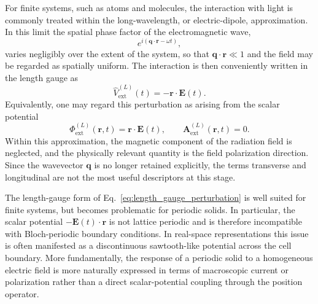 For finite systems, such as atoms and molecules, the interaction with light is commonly treated within the long-wavelength, or electric-dipole, approximation. In this limit the spatial phase factor of the electromagnetic wave,
\begin{equation}
e^{i(\mathbf q\cdot \mathbf r-\omega t)},
\end{equation}
varies negligibly over the extent of the system, so that \(\mathbf q\cdot \mathbf r \ll 1\) and the field may be regarded as spatially uniform. The interaction is then conveniently written in the length gauge as
\begin{equation}
\hat V_{\mathrm{ext}}^{(L)}(t)
=
-\mathbf r \cdot \mathbf E(t).
\label{eq:length_gauge_perturbation}
\end{equation}
Equivalently, one may regard this perturbation as arising from the scalar potential
\begin{equation}
\Phi_{\mathrm{ext}}^{(L)}(\mathbf r,t)
=
\mathbf r\cdot \mathbf E(t),
\qquad
\mathbf A_{\mathrm{ext}}^{(L)}(\mathbf r,t)=0.
\label{eq:length_gauge_potentials}
\end{equation}
Within this approximation, the magnetic component of the radiation field is neglected, and the physically relevant quantity is the field polarization direction. Since the wavevector \(\mathbf q\) is no longer retained explicitly, the terms transverse and longitudinal are not the most useful descriptors at this stage.

The length-gauge form of Eq.~\eqref{eq:length_gauge_perturbation} is well suited for finite systems, but becomes problematic for periodic solids. In particular, the scalar potential \(-\mathbf E(t)\cdot\mathbf r\) is not lattice periodic and is therefore incompatible with Bloch-periodic boundary conditions. In real-space representations this issue is often manifested as a discontinuous sawtooth-like potential across the cell boundary. More fundamentally, the response of a periodic solid to a homogeneous electric field is more naturally expressed in terms of macroscopic current or polarization rather than a direct scalar-potential coupling through the position operator.

